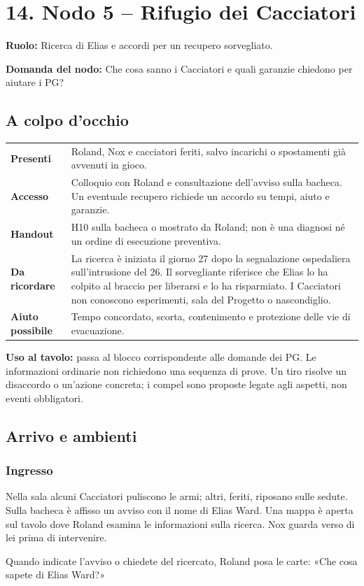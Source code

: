 \documentclass[11pt,a4paper]{article}
\newcommand{\yhdivider}{%
  \par\nobreak\noindent
  \begin{tikzpicture}
    \fill[brass!85] (0,0) -- (0,.7mm) -- (\linewidth,.18mm) -- cycle;
  \end{tikzpicture}\par\nobreak}
\newcommand{\nodehead}[3]{%
\clearpage
{\titleformat{\section}{\displayfont\huge\scshape\color{blood}}{}{0pt}{}[\yhdivider]%
\section{#1}}
\begin{bloodbox}[title={Il nodo al tavolo}]
\textbf{Ruolo:} #2\par\smallskip
\textbf{Domanda del nodo:} #3
\end{bloodbox}}
\begin{document}
\nodehead{14. Nodo 5 -- Rifugio dei Cacciatori}{Ricerca di Elias e accordi per un recupero sorvegliato.}{Che cosa sanno i Cacciatori e quali garanzie chiedono per aiutare i PG?}

\subsection{A colpo d'occhio}
\begin{overviewbox}
\begin{tabularx}{\linewidth}{>{\bfseries}p{32mm} X}
Presenti & Roland, Nox e cacciatori feriti, salvo incarichi o spostamenti già avvenuti in gioco.\\
Accesso & Colloquio con Roland e consultazione dell'avviso sulla bacheca. Un eventuale recupero richiede un accordo su tempi, aiuto e garanzie.\\
Handout & H10 sulla bacheca o mostrato da Roland; non è una diagnosi né un ordine di esecuzione preventiva.\\
Da ricordare & La ricerca è iniziata il giorno 27 dopo la segnalazione ospedaliera sull'intrusione del 26. Il sorvegliante riferisce che Elias lo ha colpito al braccio per liberarsi e lo ha risparmiato. I Cacciatori non conoscono esperimenti, sala del Progetto o nascondiglio.\\
Aiuto possibile & Tempo concordato, scorta, contenimento e protezione delle vie di evacuazione.\\
\end{tabularx}
\end{overviewbox}

\textbf{Uso al tavolo:} passa al blocco corrispondente alle domande dei PG. Le informazioni ordinarie non richiedono una sequenza di prove. Un tiro risolve un disaccordo o un'azione concreta; i compel sono proposte legate agli aspetti, non eventi obbligatori.

\subsection{Arrivo e ambienti}
\subsubsection{Ingresso}
\begin{readaloud}
Nella sala alcuni Cacciatori puliscono le armi; altri, feriti, riposano sulle sedute. Sulla bacheca è affisso un avviso con il nome di Elias Ward. Una mappa è aperta sul tavolo dove Roland esamina le informazioni sulla ricerca. Nox guarda verso di lei prima di intervenire.

Quando indicate l'avviso o chiedete del ricercato, Roland posa le carte: «Che cosa sapete di Elias Ward?»
\end{readaloud}
\end{document}
